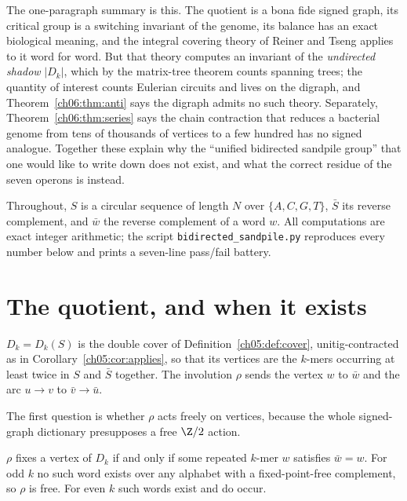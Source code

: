 The one-paragraph summary is this. The quotient is a bona fide signed graph, its critical
group is a switching invariant of the genome, its balance has an exact biological meaning,
and the integral covering theory of Reiner and Tseng \cite{RT14} applies to it word for word.
But that theory computes an invariant of the \emph{undirected shadow} $|D_k|$, which by the
matrix-tree theorem counts spanning trees; the quantity of interest counts Eulerian circuits
and lives on the digraph, and Theorem~\ref{ch06:thm:anti} says the digraph admits no such theory.
Separately, Theorem~\ref{ch06:thm:series} says the chain contraction that reduces a bacterial
genome from tens of thousands of vertices to a few hundred has no signed analogue. Together
these explain why the ``unified bidirected sandpile group'' that one would like to write down
does not exist, and what the correct residue of the seven operons is instead.

Throughout, $S$ is a circular sequence of length $N$ over $\{A,C,G,T\}$, $\bar S$ its reverse
complement, and $\bar w$ the reverse complement of a word $w$. All computations are exact
integer arithmetic; the script \texttt{bidirected\_sandpile.py} reproduces every number below
and prints a seven-line pass/fail battery.

\section{The quotient, and when it exists}\label{ch06:sec:quotient}

\begin{definition}
$D_k=D_k(S)$ is the double cover of Definition~\ref{ch05:def:cover}, unitig-contracted as in
Corollary~\ref{ch05:cor:applies}, so that its vertices are the $k$-mers occurring at least twice
in $S$ and $\bar S$ together. The involution
$\rho$ sends the vertex $w$ to $\bar w$ and the arc $u\to v$ to $\bar v\to\bar u$.
\end{definition}

The first question is whether $\rho$ acts freely on vertices, because the whole signed-graph
dictionary presupposes a free $\Z/2$ action.

\begin{proposition}\label{ch06:prop:parity}
$\rho$ fixes a vertex of $D_k$ if and only if some repeated $k$-mer $w$ satisfies
$\bar w=w$. For odd $k$ no such word exists over any alphabet with a fixed-point-free
complement, so $\rho$ is free. For even $k$ such words exist and do occur.
\end{proposition}

